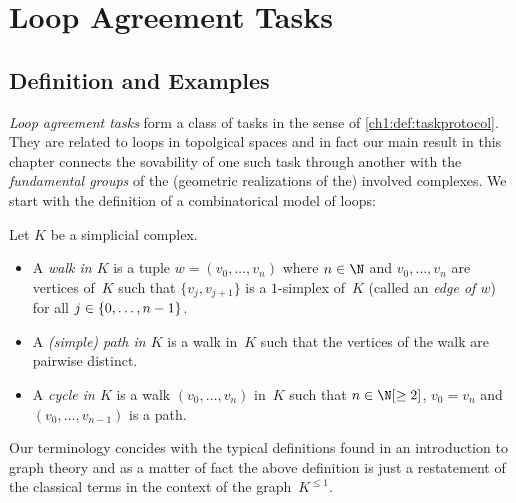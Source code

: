 \chapter{Loop Agreement Tasks}
\section{Definition and Examples}
\emph{Loop agreement tasks} form a class of tasks in the sense of
\cref{ch1:def:taskprotocol}. They are related to loops in topolgical spaces
and in fact our main result in this chapter  %
connects the sovability of one such task through another with the
\emph{fundamental groups} of the (geometric realizations of the)
involved complexes. We start with the definition of a combinatorical
model of loops:

\begin{thDef}
    Let $K$ be a simplicial complex.
    \begin{itemize}
        \item
            A \emph{walk in $K$} is a tuple $w = (v_0,\dots,v_n)$
            where $n\in\N$ and $v_0,\dots,v_n$ are vertices
            of~$K$ such that $\{v_j,v_{j+1}\}$ is a $1$-simplex of~$K$
            (called an \emph{edge of $w$}) for all $j\in\{0,\ldots,n-1\}$.
            
        \item
            A \emph{(simple) path in $K$} is a walk in~$K$ such that the
            vertices of the walk are pairwise distinct.
            
        \item
            A \emph{cycle in $K$} is a walk $(v_0,\dots,v_n)$ in~$K$ such that
            $n\in\N[\geq2]$, $v_0 = v_n$ and $(v_0,\dots,v_{n-1})$ is a path.
    \end{itemize}
\end{thDef}

Our terminology concides with the typical definitions found in an introduction
to graph theory and as a matter of fact the above definition is just a
restatement of the classical terms in the context of the graph~$K^{\leq 1}$.

